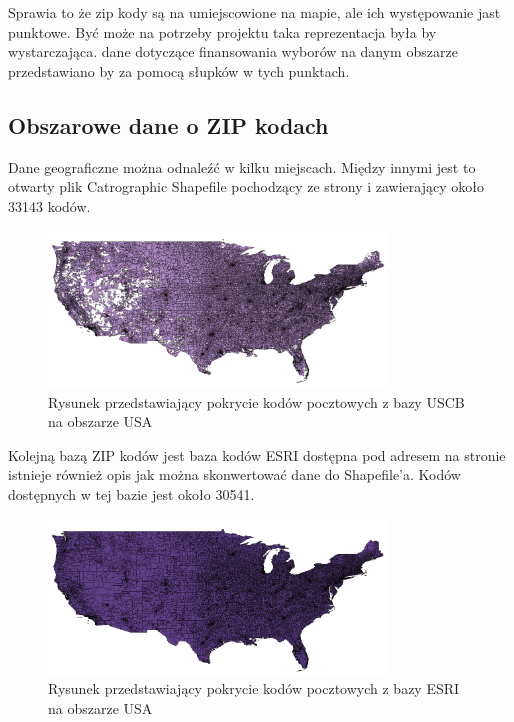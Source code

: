 \documentclass[10pt,a4paper]{article}
\begin{document}
Sprawia to że zip kody są na umiejscowione na mapie, ale ich występowanie jast punktowe.
Być może na potrzeby projektu taka reprezentacja była by wystarczająca. dane dotyczące finansowania wyborów na danym obszarze przedstawiano by za pomocą słupków w tych punktach.

\subsection{Obszarowe dane o ZIP kodach}
Dane geograficzne można odnaleźć w kilku miejscach.
Między innymi jest to otwarty plik Catrographic Shapefile pochodzący ze strony \cite[US Census Bureau]{unitedStateCensusBureauGeoMaps}
i zawierający około 33143 kodów.

\begin{figure}[H]
    \centering
    \includegraphics[width=0.8\textwidth]{bazaUSCB.png}
    \caption{Rysunek przedstawiający pokrycie kodów pocztowych z bazy USCB na obszarze USA}
    \label{fig:imageUSCB}
\end{figure}

Kolejną bazą ZIP kodów jest baza kodów ESRI dostępna pod adresem \cite[Arcgis]{arcgisDatabase} na stronie istnieje również opis jak można skonwertować dane do Shapefile'a. Kodów dostępnych w tej bazie jest około 30541. 

\begin{figure}[H]
    \centering
    \includegraphics[width=0.8\textwidth]{bazaESRI.png}
    \caption{Rysunek przedstawiający pokrycie kodów pocztowych z bazy ESRI na obszarze USA}
    \label{fig:imageESRI}
\end{figure}
 
\end{document}
